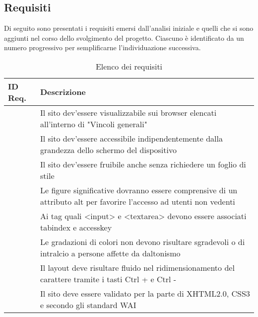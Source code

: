 {	\subsection{Requisiti}{
		Di seguito sono presentati i requisiti emersi dall'analisi iniziale e quelli che si sono aggiunti nel corso dello svolgimento del progetto. Ciascuno è identificato da un numero progressivo per semplificarne l'individuazione successiva.\\
		\newcommand\rownumber{\stepcounter{magicrownumbers}\arabic{magicrownumbers}}
		\begin{table}[h]
			\centering
			\begin{tabular}{|p{}|p{}|}
				\hline
				\textbf{ID Req.} & \textbf{Descrizione}\\
				\hline
				\centering \rownumber	&	Il sito dev'essere visualizzabile sui browser elencati all'interno di "Vincoli generali"\\
				\hline
				\centering \rownumber	&	Il sito dev'essere accessibile indipendentemente dalla grandezza dello schermo del dispositivo\\
				\hline
				\centering \rownumber	&	Il sito dev'essere fruibile anche senza richiedere un foglio di stile\\
				\hline
				\centering \rownumber	&	Le figure significative dovranno essere comprensive di un attributo alt per favorire l'accesso ad utenti non vedenti\\
				\hline
				\centering \rownumber	&	Ai tag quali <input> e <textarea> devono essere associati tabindex e accesskey\\
				\hline
				\centering \rownumber	&	Le gradazioni di colori non devono risultare sgradevoli o di intralcio a persone affette da daltonismo\\
				\hline
				\centering \rownumber	&	Il layout deve risultare fluido nel ridimensionamento del carattere tramite i tasti Ctrl + e Ctrl -\\
				\hline
				\centering \rownumber	&	Il sito deve essere validato per la parte di XHTML2.0, CSS3 e secondo gli standard WAI\\
				\hline
			\end{tabular}
			\label{tab:requisiti}
			\caption{Elenco dei requisiti}
		\end{table}
	}
}
